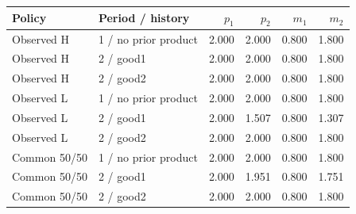 \begin{tabular}{llrrrr}\toprule
Policy & Period / history & $p_1$ & $p_2$ & $m_1$ & $m_2$\\\midrule
Observed H & 1 / no prior product & 2.000 & 2.000 & 0.800 & 1.800\\
Observed H & 2 / good1 & 2.000 & 2.000 & 0.800 & 1.800\\
Observed H & 2 / good2 & 2.000 & 2.000 & 0.800 & 1.800\\
\addlinespace
Observed L & 1 / no prior product & 2.000 & 2.000 & 0.800 & 1.800\\
Observed L & 2 / good1 & 2.000 & 1.507 & 0.800 & 1.307\\
Observed L & 2 / good2 & 2.000 & 2.000 & 0.800 & 1.800\\
\addlinespace
Common 50/50 & 1 / no prior product & 2.000 & 2.000 & 0.800 & 1.800\\
Common 50/50 & 2 / good1 & 2.000 & 1.951 & 0.800 & 1.751\\
Common 50/50 & 2 / good2 & 2.000 & 2.000 & 0.800 & 1.800\\
\bottomrule\end{tabular}
